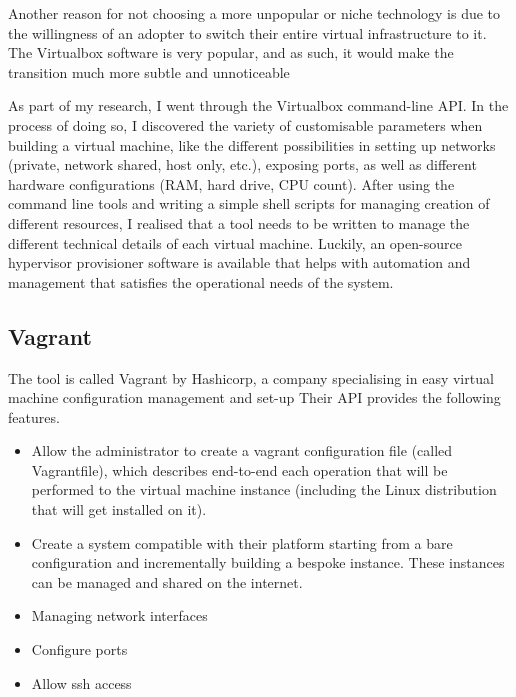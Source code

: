 \documentclass{article}
\begin{document}
Another reason for not choosing a more unpopular or niche technology is due to the willingness of an adopter to switch their entire virtual infrastructure to it. The Virtualbox software is very popular, and as such, it would make the transition much more subtle and unnoticeable

As part of my research, I went through the Virtualbox command-line API. In the process of doing so, I discovered the variety of customisable parameters when building a virtual machine, like the different possibilities in setting up networks (private, network shared, host only, etc.), exposing ports, as well as different hardware configurations (RAM, hard drive, CPU count). After using the command line tools and writing a simple shell scripts for managing creation of different resources, I realised that a tool needs to be written to manage the different technical details of each virtual machine. Luckily, an open-source hypervisor provisioner software is available that helps with automation and management that satisfies the operational needs of the system.

\subsection{Vagrant}
The tool is called Vagrant by Hashicorp, a company specialising in easy virtual machine configuration management and set-up Their API provides the following features.

\begin{itemize}
	\item
	      Allow the administrator to create a \gls{vagrant} configuration file (called Vagrantfile), which describes end-to-end each operation that will be performed to the virtual machine instance (including the Linux distribution that will get installed on it).
	\item
	      Create a system compatible with their platform starting from a bare configuration and incrementally building a bespoke instance. These instances can be managed and shared on the internet.
	\item
	      Managing network interfaces
	\item
	      Configure ports
	\item
	      Allow \gls{ssh} access
\end{itemize}
\end{document}
